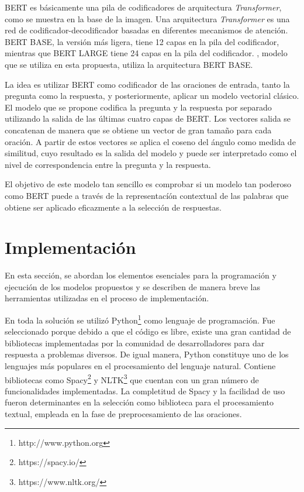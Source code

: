 BERT es básicamente una pila de codificadores de arquitectura \textit{Transformer}, como se muestra en la base de la imagen. Una arquitectura \textit{Transformer} es una red de codificador-decodificador basadas en diferentes mecanismos de atención. BERT BASE, la versión más ligera, tiene 12 capas en la pila del codificador, mientras que BERT LARGE tiene 24 capas en la pila del codificador. \cite{2020-spanish-bert}, modelo que se utiliza en esta propuesta, utiliza la arquitectura BERT BASE.

La idea es utilizar BERT como codificador de las oraciones de entrada, tanto la pregunta como la respuesta, y posteriormente, aplicar un modelo vectorial clásico. El modelo que se propone codifica la pregunta y la respuesta por separado utilizando la salida de las últimas cuatro capas de BERT. Los vectores salida se concatenan de manera que se obtiene un vector de gran tamaño para cada oración. A partir de estos vectores se aplica el coseno del ángulo como medida de similitud, cuyo resultado es la salida del modelo y puede ser interpretado como el nivel de correspondencia entre la pregunta y la respuesta.

El objetivo de este modelo tan sencillo es comprobar si un modelo tan poderoso como BERT puede a través de la representacíón contextual de las palabras que obtiene ser aplicado eficazmente a la selección de respuestas.

\section{Implementación}\label{section:implementation}

En esta sección, se abordan los elementos esenciales para la programación y ejecución de los modelos propuestos y se describen de manera breve las herramientas utilizadas en el proceso de implementación.

En toda la solución se utilizó Python\footnote{http://www.python.org} como lenguaje de programación. Fue seleccionado porque debido a que el código es libre, existe una gran cantidad de bibliotecas implementadas por la comunidad de desarrolladores para dar respuesta a problemas diversos. De igual manera, Python constituye uno de los lenguajes más populares en el procesamiento del lenguaje natural. Contiene bibliotecas como Spacy\footnote{https://spacy.io/} y NLTK\footnote{https://www.nltk.org/} que cuentan con un gran número de funcionalidades implementadas. La completitud de Spacy y la facilidad de uso fueron determinantes en la selección como biblioteca para el procesamiento textual, empleada en la fase de preprocesamiento de las oraciones. 

